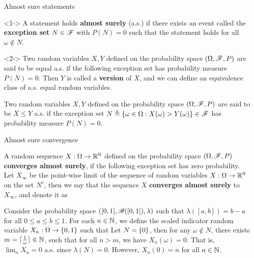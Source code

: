 \documentclass[12pt,aspectratio=169]{beamer}
\begin{document}
\begin{frame}{Almost sure statements}
\begin{Definition}<1->
A statement holds \textbf{almost surely} (a.s.) if there exists an event called the \textbf{exception set} $N \in \mathscr{F}$ with $P(N) = 0$ such that the statement holds for all $\omega \notin N$. 
\end{Definition}


\begin{Example}<2->
Two random variables $X, Y$ defined on the probability space $(\Omega, \mathscr{F}, P)$ are said to be equal a.s. if the following exception set 
has probability measure $P(N) = 0$. 
Then $Y$ is called a \textbf{version} of $X$, and we can define an equivalence class of a.s. equal random variables. 
\end{Example}
\end{frame}
\begin{frame}
\begin{Example} 
Two random variables $X, Y$ defined on the probability space $(\Omega, \mathscr{F}, P)$ are said to be $X \le Y$ a.s. if the exception set $N \triangleq \left\{\omega \in \Omega: X(\omega) > Y(\omega)\right\} \in \mathscr{F}$ has probability measure $P(N) = 0$. 
\end{Example}
\end{frame}


\begin{frame}{Almost sure convergence}

\begin{Definition}
A random sequence $X:\Omega\to\mathbb{R}^{\mathbb{N}}$ defined on the probability space $(\Omega, \mathscr{F}, P)$ \textbf{converges almost surely}, 
if the following exception set 
has zero probability. 
Let $X_\infty$ be the point-wise limit of the sequence of random variables $X:\Omega\to\mathbb{R}^{\mathbb{N}}$ on the set $N^c$, 
then we say that the sequence $X$ \textbf{converges almost surely} to $X_\infty$, and denote it as 
\end{Definition}
\end{frame}

\begin{frame}
\begin{Example} 
Consider the probability space $([0,1], \mathscr{B}([0,1]), \lambda)$ such that $\lambda([a,b]) = b-a$ for all $0 \le a \le b \le 1$. 
For each $n \in \mathbb{N}$, we define the scaled indicator random variable $X_n: \Omega \to \left\{0,1\right\}$ such that
Let $N = \left\{0\right\}$, then for any $\omega \notin N$, there exists $m = \lceil\frac{1}{\omega}\rceil \in \mathbb{N}$, such that for all $n > m$, we have $X_n(\omega) = 0$. 
That is, $\lim_nX_n = 0$ a.s. since $\lambda(N) = 0$. 
However, $X_n(0) = n$ for all $n \in \mathbb{N}$. 
\end{Example}
\end{frame}
\end{document}
